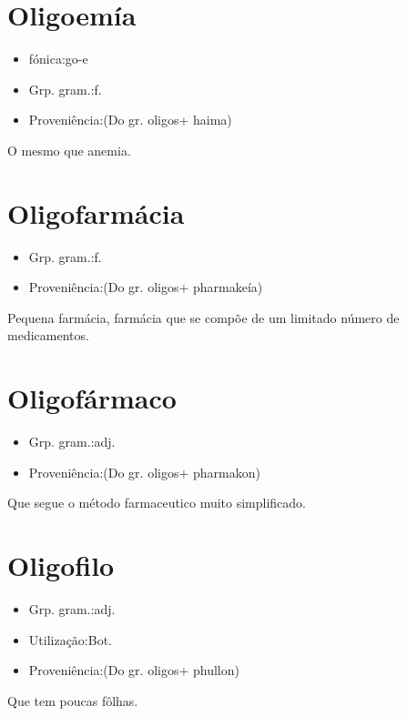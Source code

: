 \section{Oligoemía}
\begin{itemize}
\item {fónica:go-e}
\end{itemize}
\begin{itemize}
\item {Grp. gram.:f.}
\end{itemize}
\begin{itemize}
\item {Proveniência:(Do gr. \textunderscore oligos\textunderscore  + \textunderscore haima\textunderscore )}
\end{itemize}
O mesmo que \textunderscore anemia\textunderscore .
\section{Oligofarmácia}
\begin{itemize}
\item {Grp. gram.:f.}
\end{itemize}
\begin{itemize}
\item {Proveniência:(Do gr. \textunderscore oligos\textunderscore  + \textunderscore pharmakeía\textunderscore )}
\end{itemize}
Pequena farmácia, farmácia que se compõe de um limitado número de medicamentos.
\section{Oligofármaco}
\begin{itemize}
\item {Grp. gram.:adj.}
\end{itemize}
\begin{itemize}
\item {Proveniência:(Do gr. \textunderscore oligos\textunderscore  + \textunderscore pharmakon\textunderscore )}
\end{itemize}
Que segue o método farmaceutico muito simplificado.
\section{Oligofilo}
\begin{itemize}
\item {Grp. gram.:adj.}
\end{itemize}
\begin{itemize}
\item {Utilização:Bot.}
\end{itemize}
\begin{itemize}
\item {Proveniência:(Do gr. \textunderscore oligos\textunderscore  + \textunderscore phullon\textunderscore )}
\end{itemize}
Que tem poucas fôlhas.
